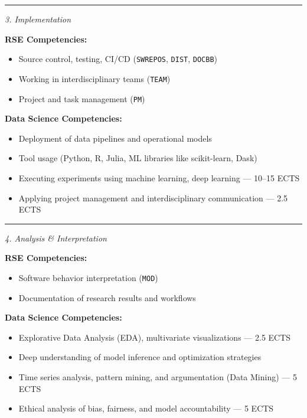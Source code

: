 \documentclass[
        english,biblatex
    ]{lni}
\providecommand{\tightlist}{%
    \setlength{\itemsep}{0pt}\setlength{\parskip}{0pt}}
\begin{document}
    \begin{center}\rule{0.5\linewidth}{0.5pt}\end{center}

    \emph{3. Implementation}

    \textbf{RSE Competencies:}

    \begin{itemize}
    \tightlist
    \item
      Source control, testing, CI/CD (\texttt{SWREPOS}, \texttt{DIST},
      \texttt{DOCBB})
    \item
      Working in interdisciplinary teams (\texttt{TEAM})
    \item
      Project and task management (\texttt{PM})
    \end{itemize}

    \textbf{Data Science Competencies:}

    \begin{itemize}
    \tightlist
    \item
      Deployment of data pipelines and operational models
    \item
      Tool usage (Python, R, Julia, ML libraries like scikit-learn,
      Dask)
    \item
      Executing experiments using machine learning, deep learning ---
      10--15 ECTS
    \item
      Applying project management and interdisciplinary communication
      --- 2.5 ECTS
    \end{itemize}

    \begin{center}\rule{0.5\linewidth}{0.5pt}\end{center}

    \emph{4. Analysis \& Interpretation}

    \textbf{RSE Competencies:}

    \begin{itemize}
    \tightlist
    \item
      Software behavior interpretation (\texttt{MOD})
    \item
      Documentation of research results and workflows
    \end{itemize}

    \textbf{Data Science Competencies:}

    \begin{itemize}
    \tightlist
    \item
      Explorative Data Analysis (EDA), multivariate visualizations ---
      2.5 ECTS
    \item
      Deep understanding of model inference and optimization strategies
    \item
      Time series analysis, pattern mining, and argumentation (Data
      Mining) --- 5 ECTS
    \item
      Ethical analysis of bias, fairness, and model accountability --- 5
      ECTS
    \end{itemize}
\end{document}
